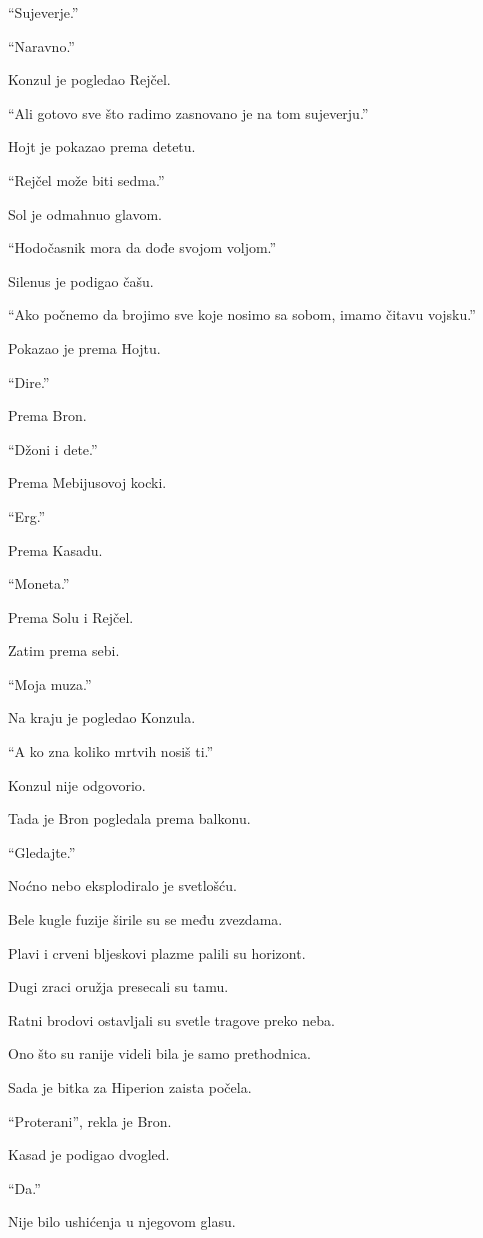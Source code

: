``Sujeverje.''

``Naravno.''

Konzul je pogledao Rejčel.

``Ali gotovo sve što radimo zasnovano je na tom sujeverju.''

Hojt je pokazao prema detetu.

``Rejčel može biti sedma.''

Sol je odmahnuo glavom.

``Hodočasnik mora da dođe svojom voljom.''

Silenus je podigao čašu.

``Ako počnemo da brojimo sve koje nosimo sa sobom, imamo čitavu vojsku.''

Pokazao je prema Hojtu.

``Dire.''

Prema Bron.

``Džoni i dete.''

Prema Mebijusovoj kocki.

``Erg.''

Prema Kasadu.

``Moneta.''

Prema Solu i Rejčel.

Zatim prema sebi.

``Moja muza.''

Na kraju je pogledao Konzula.

``A ko zna koliko mrtvih nosiš ti.''

Konzul nije odgovorio.

\bigskip

Tada je Bron pogledala prema balkonu.

``Gledajte.''

Noćno nebo eksplodiralo je svetlošću.

Bele kugle fuzije širile su se među zvezdama.

Plavi i crveni bljeskovi plazme palili su horizont.

Dugi zraci oružja presecali su tamu.

Ratni brodovi ostavljali su svetle tragove preko neba.

Ono što su ranije videli bila je samo prethodnica.

Sada je bitka za Hiperion zaista počela.

``Proterani'', rekla je Bron.

Kasad je podigao dvogled.

``Da.''

Nije bilo ushićenja u njegovom glasu.

